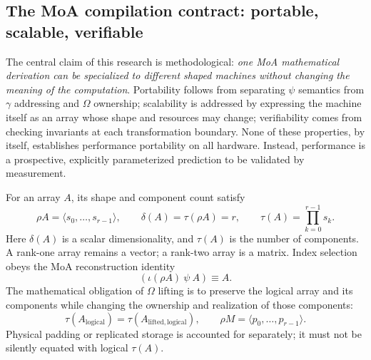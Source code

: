 \documentclass[11pt]{article}
\begin{document}
\subsection{The MoA compilation contract: portable, scalable, verifiable}
\label{step108:subsec:moa-compiler-contract}

The central claim of this research is methodological: \emph{one MoA
mathematical derivation can be specialized to different shaped machines
without changing the meaning of the computation}.  Portability follows
from separating $\psi$ semantics from $\gamma$ addressing and $\Omega$
ownership; scalability is addressed by expressing the machine itself as
an array whose shape and resources may change; verifiability comes from
checking invariants at each transformation boundary.  None of these
properties, by itself, establishes performance portability on all
hardware.  Instead, performance is a prospective, explicitly
parameterized prediction to be validated by measurement.

For an array $A$, its shape and component count satisfy
\begin{equation}
 \rho A=\langle s_0,\ldots,s_{r-1}\rangle,\qquad
 \delta(A)=\tau(\rho A)=r,\qquad
 \tau(A)=\prod_{k=0}^{r-1}s_k .
 \label{step108:eq:moa-core-invariants}
\end{equation}
Here $\delta(A)$ is a scalar dimensionality, and $\tau(A)$ is the
number of components.  A rank-one array remains a vector; a rank-two
array is a matrix.  Index selection obeys the MoA reconstruction
identity
\begin{equation}
       (\iota(\rho A)\ \psi\ A)\equiv A .
       \label{step108:eq:moa-reconstruction}
\end{equation}
The mathematical obligation of $\Omega$ lifting is to preserve the
logical array and its components while changing the ownership and
realization of those components:
\begin{equation}
 \tau(A_{\mathrm{logical}})=\tau(A_{\mathrm{lifted,logical}}),
 \qquad
 \rho M=\langle p_0,\ldots,p_{r-1}\rangle .
 \label{step108:eq:moa-lifting-invariant}
\end{equation}
Physical padding or replicated storage is accounted for separately;
it must not be silently equated with logical $\tau(A)$.
\end{document}
